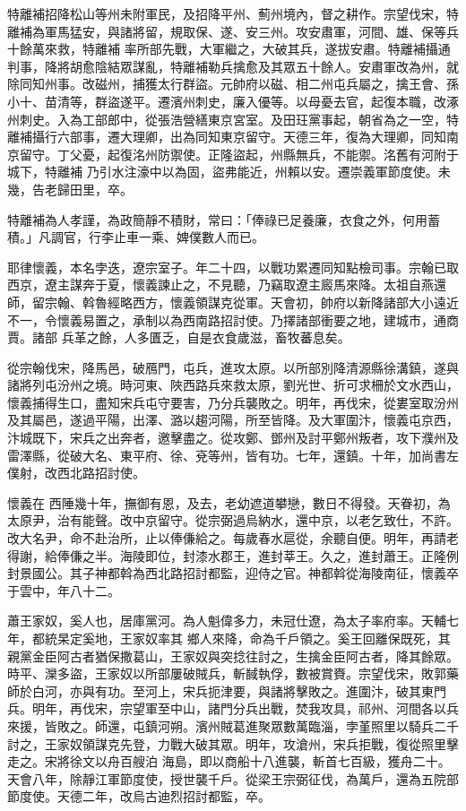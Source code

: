 \begin{pinyinscope}
 特離補招降松山等州未附軍民，及招降平州、薊州境內，督之耕作。宗望伐宋，特離補為軍馬猛安，與諸將留，規取保、遂、安三州。攻安肅軍，河間、雄、保等兵十餘萬來救，特離補
 率所部先戰，大軍繼之，大破其兵，遂拔安肅。特離補攝通判事，降將胡愈陰結眾謀亂，特離補勒兵擒愈及其眾五十餘人。安肅軍改為州，就除同知州事。改磁州，捕獲太行群盜。元帥府以磁、相二州屯兵屬之，擒王會、孫小十、苗清等，群盜遂平。遷濱州刺史，廉入優等。以母憂去官，起復本職，改涿州刺史。入為工部郎中，從張浩營繕東京宮室。及田玨黨事起，朝省為之一空，特離補攝行六部事，遷大理卿，出為同知東京留守。天德三年，復為大理卿，同知南京留守。丁父憂，起復洺州防禦使。正隆盜起，州縣無兵，不能禦。洺舊有河附于城下，特離補
 乃引水注濠中以為固，盜弗能近，州賴以安。遷崇義軍節度使。未幾，告老歸田里，卒。



 特離補為人孝謹，為政簡靜不積財，常曰：「俸祿已足養廉，衣食之外，何用蓄積。」凡調官，行李止車一乘、婢僕數人而已。



 耶律懷義，本名孛迭，遼宗室子。年二十四，以戰功累遷同知點檢司事。宗翰已取西京，遼主謀奔于夏，懷義諫止之，不見聽，乃竊取遼主廄馬來降。太祖自燕還師，留宗翰、斡魯經略西方，懷義領謀克從軍。天會初，帥府以新降諸部大小遠近不一，令懷義易置之，承制以為西南路招討使。乃擇諸部衝要之地，建城市，通商賈。諸部
 兵革之餘，人多匱乏，自是衣食歲滋，畜牧蕃息矣。



 從宗翰伐宋，降馬邑，破鴈門，屯兵，進攻太原。以所部別降清源縣徐溝鎮，遂與諸將列屯汾州之境。時河東、陜西路兵來救太原，劉光世、折可求柵於文水西山，懷義捕得生口，盡知宋兵屯守要害，乃分兵襲敗之。明年，再伐宋，從婁室取汾州及其屬邑，遂過平陽，出澤、潞以趨河陽，所至皆降。及大軍圍汴，懷義屯京西，汴城既下，宋兵之出奔者，邀擊盡之。從攻鄭、鄧州及討平鄭州叛者，攻下濮州及雷澤縣，從破大名、東平府、徐、兗等州，皆有功。七年，還鎮。十年，加尚書左僕射，改西北路招討使。



 懷義在
 西陲幾十年，撫御有恩，及去，老幼遮道攀戀，數日不得發。天眷初，為太原尹，治有能聲。改中京留守。從宗弼過烏納水，還中京，以老乞致仕，不許。改大名尹，命不赴治所，止以俸傔給之。每歲春水扈從，余聽自便。明年，再請老得謝，給俸傔之半。海陵即位，封漆水郡王，進封莘王。久之，進封蕭王。正隆例封景國公。其子神都斡為西北路招討都監，迎侍之官。神都斡從海陵南征，懷義卒于雲中，年八十二。



 蕭王家奴，奚人也，居庫黨河。為人魁偉多力，未冠仕遼，為太子率府率。天輔七年，都統杲定奚地，王家奴率其
 鄉人來降，命為千戶領之。奚王回離保既死，其親黨金臣阿古者猶保撒葛山，王家奴與突捻往討之，生擒金臣阿古者，降其餘眾。時平、灤多盜，王家奴以所部屢破賊兵，斬馘執俘，數被賞賚。宗望伐宋，敗郭藥師於白河，亦與有功。至河上，宋兵扼津要，與諸將擊敗之。進圍汴，破其東門兵。明年，再伐宋，宗望軍至中山，諸門分兵出戰，焚我攻具，祁州、河間各以兵來援，皆敗之。師還，屯鎮河朔。濱州賊葛進聚眾數萬臨淄，孛堇照里以騎兵二千討之，王家奴領謀克先登，力戰大破其眾。明年，攻滄州，宋兵拒戰，復從照里擊走之。宋將徐文以舟百艘泊
 海島，即以商船十八進襲，斬首七百級，獲舟二十。天會八年，除靜江軍節度使，授世襲千戶。從梁王宗弼征伐，為萬戶，還為五院部節度使。天德二年，改烏古迪烈招討都監，卒。




\end{pinyinscope}
